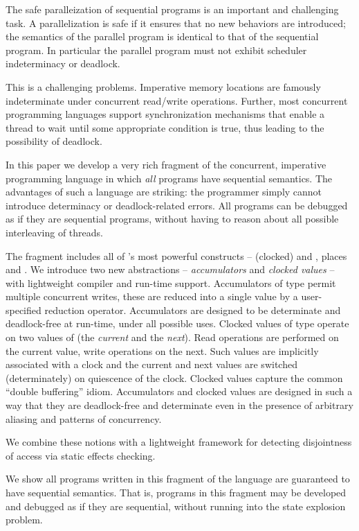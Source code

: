 
The safe paralleization of sequential programs is an important and
challenging task. A parallelization is safe if it ensures that no new
behaviors are introduced; the semantics of the parallel program is
identical to that of the sequential program. In particular the
parallel program must not exhibit scheduler indeterminacy or deadlock.

This is a challenging problems.  Imperative memory locations are
famously indeterminate under concurrent read/write
operations. Further, most concurrent programming languages support
synchronization mechanisms that enable a thread to wait until some
appropriate condition is true, thus leading to the possibility of
deadlock.

In this paper we develop a very rich fragment of the concurrent,
imperative programming language \Xten{} in which {\em all} programs
have sequential semantics. The advantages of such a language are
striking: the programmer simply cannot introduce determinacy or
deadlock-related errors. All programs can be debugged as if they are
sequential programs, without having to reason about all possible
interleaving of threads. 

The fragment includes all of \Xten{}'s most powerful constructs --
(clocked)  and , places and {}. We
introduce two new abstractions -- {\em accumulators} and {\em clocked
  values} -- with lightweight compiler and run-time
support. Accumulators of type  permit multiple concurrent
writes, these are reduced into a single value by a user-specified
reduction operator. Accumulators are designed to be determinate and
deadlock-free at run-time, under all possible uses.  Clocked values of
type  operate on two values of  (the {\em current} and
the {\em next}). Read operations are performed on the current value,
write operations on the next. Such values are implicitly associated
with a clock and the current and next values are switched
(determinately) on quiescence of the clock. Clocked values capture the
common ``double buffering'' idiom. Accumulators and clocked values are
designed in such a way that they are deadlock-free and determinate
even in the presence of arbitrary aliasing and patterns of
concurrency.

We combine these notions with a lightweight framework for detecting
disjointness of access via static effects checking. 

We show all programs written in this fragment of the language are
guaranteed to have sequential semantics. That is, programs in this
fragment may be developed and debugged as if they are sequential,
without running into the state explosion problem. 

